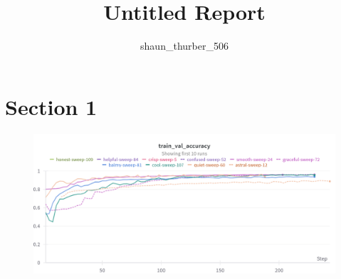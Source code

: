 \documentclass{article}
\title{Untitled Report}
\author{%
shaun_thurber_506
}
\begin{document}
\maketitle

\section{Section 1}

\begin{figure}[!htb]
\includegraphics[width=\linewidth]{charts/Section-2-Panel-0-ssr436ayy}
\caption{}
\endminipage
\end{figure}

\nocite{*}


\end{document}
